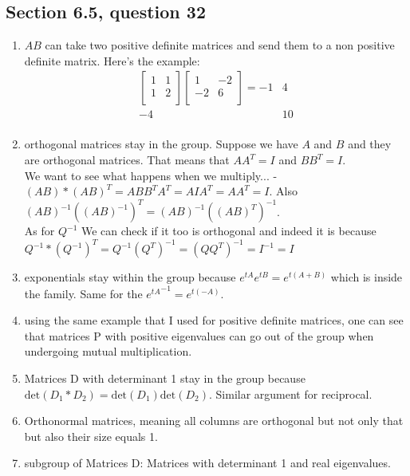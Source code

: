 \documentclass[a4paper,11pt]{article}
\newcommand{\?}{\stackrel{?}{=}}
\begin{document}
\subsection*{Section 6.5, question 32}
\begin{enumerate}[label=\alph*]
\item $AB$ can take two positive definite matrices and send them to a non positive definite matrix. Here's the example:
\begin{align*}
\begin{bmatrix}
1 & 1 \\
1 & 2 \\
\end{bmatrix} 
\begin{bmatrix}
1 & -2 \\
-2 & 6 \\
\end{bmatrix}=
-1 & 4 \\
-4 & 10 \\
\end{align*}
\item orthogonal matrices stay in the group.
Suppose we have $A$ and $B$ and they are orthogonal matrices. That means that $A{A^T}=I$ and $B{B^T}=I$. \\
We want to see what happens when we multiply... - $(AB)*(AB)^T= A{B}{B^T}{A^T} = A{I}A^T=A{A^T}=I$. Also $(AB)^{-1}((AB)^{-1})^T = (AB)^{-1}((AB)^T)^{-1}$. \\
As for $Q^{-1}$ We can check if it too is orthogonal and indeed it is because $Q^{-1}*(Q^{-1})^T=Q^{-1}(Q^{T})^{-1}=(Q{Q^{T}})^{-1}=I^{-1}=I$
\item exponentials stay within the group because $e^{tA}{e^{tB}}=e^{t(A+B)}$ which is inside the family. Same for the ${e^{tA}}^{-1}=e^{t(-A)}$.
\item using the same example that I used for positive definite matrices, one can see that matrices P with positive eigenvalues can go out of the group when undergoing mutual multiplication.
\item Matrices D with determinant 1 stay in the group because $\text{det}(D_1*D_2)=\text{det}(D_1)\text{det}(D_2)$. Similar argument for reciprocal.
\item Orthonormal matrices, meaning all columns are orthogonal but not only that but also their size equals 1.
\item subgroup of Matrices D: Matrices with determinant 1 and real eigenvalues.
\end{enumerate}
\end{document}
